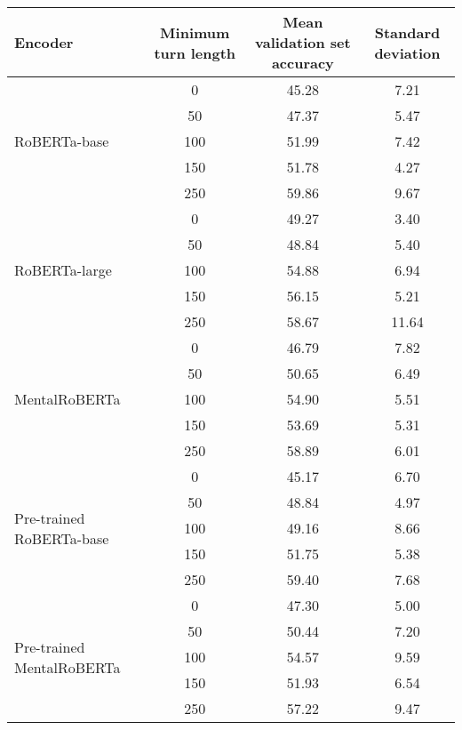 \begin{tabular}{lccc}
\toprule
Encoder & Minimum turn length & Mean validation set accuracy & Standard deviation \\
\midrule
\multirow{5}{*}{RoBERTa-base} & 0 & 45.28 & 7.21 \\
& 50 & 47.37 & 5.47 \\
& 100 & 51.99 & 7.42 \\
& 150 & 51.78 & 4.27 \\
& 250 & 59.86 & 9.67 \\
\midrule
\multirow{5}{*}{RoBERTa-large} & 0 & 49.27 & 3.40 \\
& 50 & 48.84 & 5.40 \\
& 100 & 54.88 & 6.94 \\
& 150 & 56.15 & 5.21 \\
& 250 & 58.67 & 11.64 \\
\midrule
\multirow{5}{*}{MentalRoBERTa} & 0 & 46.79 & 7.82 \\
& 50 & 50.65 & 6.49 \\
& 100 & 54.90 & 5.51 \\
& 150 & 53.69 & 5.31 \\
& 250 & 58.89 & 6.01 \\
\midrule
\multirow{5}{*}{Pre-trained RoBERTa-base} & 0 & 45.17 & 6.70 \\
& 50 & 48.84 & 4.97 \\
& 100 & 49.16 & 8.66 \\
& 150 & 51.75 & 5.38 \\
& 250 & 59.40 & 7.68 \\
\midrule
\multirow{5}{*}{Pre-trained MentalRoBERTa} & 0 & 47.30 & 5.00 \\
& 50 & 50.44 & 7.20 \\
& 100 & 54.57 & 9.59 \\
& 150 & 51.93 & 6.54 \\
& 250 & 57.22 & 9.47 \\
\bottomrule
\end{tabular}
